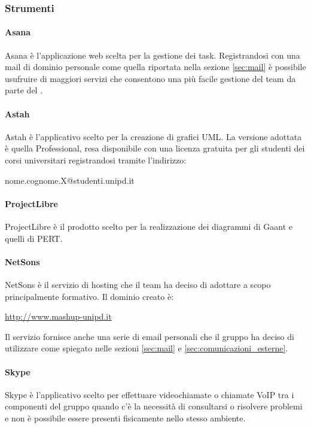 		\subsubsection{Strumenti}
			\paragraph{Asana}
			\label{sec:asana}
			Asana è l'applicazione web scelta per la gestione dei task.\newline
			Registrandosi con una mail di dominio personale come quella riportata nella sezione \ref{sec:mail} è possibile usufruire di maggiori servizi che consentono una più facile gestione del team da parte del \roleProjectManager.
			\paragraph{Astah}
			Astah è l'applicativo scelto per la creazione di grafici UML.
			La versione adottata è quella Professional, resa disponibile con una licenza gratuita per gli studenti dei corsi universitari registrandosi tramite l'indirizzo:
				\begin{center}
					nome.cognome.X@studenti.unipd.it
				\end{center}

			\paragraph{ProjectLibre}
			ProjectLibre è il prodotto scelto per la realizzazione dei diagrammi di Gaant e quelli di PERT.
			\paragraph{NetSons}
			NetSons è il servizio di hosting che il team ha deciso di adottare a scopo principalmente formativo. \newline
			Il dominio creato è:
				\begin{center}
					\url{http://www.mashup-unipd.it}
				\end{center}
			Il servizio fornisce anche una serie di email personali che il gruppo ha deciso di utilizzare come spiegato nelle sezioni \ref{sec:mail} e \ref{sec:comunicazioni_esterne}.
			\paragraph{Skype}
			Skype è l'applicativo scelto per effettuare videochiamate o chiamate VoIP tra i componenti del gruppo quando c'è la necessità di consultarsi o risolvere problemi e non è possibile essere presenti fisicamente nello stesso ambiente.		
